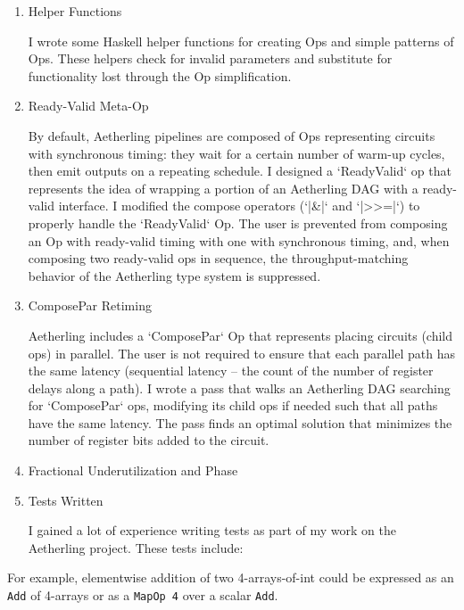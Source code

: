 \documentclass[11pt]{article}
\begin{document}
\begin{enumerate}
\item Helper Functions

I wrote some Haskell helper functions for creating Ops and simple
patterns of Ops. These helpers check for invalid parameters and
substitute for functionality lost through the Op simplification.

\item Ready-Valid Meta-Op

By default, Aetherling pipelines are composed of Ops representing
circuits with synchronous timing: they wait for a certain number of
warm-up cycles, then emit outputs on a repeating schedule. I designed
a `ReadyValid` op that represents the idea of wrapping a portion of an
Aetherling DAG with a ready-valid interface.  I modified the compose
operators (`|&|` and `|>>=|`) to properly handle the `ReadyValid` Op.
The user is prevented from composing an Op with ready-valid timing
with one with synchronous timing, and, when composing two ready-valid
ops in sequence, the throughput-matching behavior of the Aetherling
type system is suppressed.

\item ComposePar Retiming

Aetherling includes a `ComposePar` Op that represents placing circuits
(child ops) in parallel. The user is not required to ensure that each
parallel path has the same latency (sequential latency -- the count of
the number of register delays along a path). I wrote a pass that walks
an Aetherling DAG searching for `ComposePar` ops, modifying its child
ops if needed such that all paths have the same latency. The pass
finds an optimal solution that minimizes the number of register bits
added to the circuit.

\item Fractional Underutilization and Phase



\item Tests Written

I gained a lot of experience writing tests as part of my work
on the Aetherling project. These tests include:

\begin{enumerate}

\end{enumerate}

\end{enumerate}

For example, elementwise addition of two
4-arrays-of-int could be expressed as an \texttt{Add} of 4-arrays or as
a \texttt{MapOp 4} over a scalar \texttt{Add}.
\end{document}

